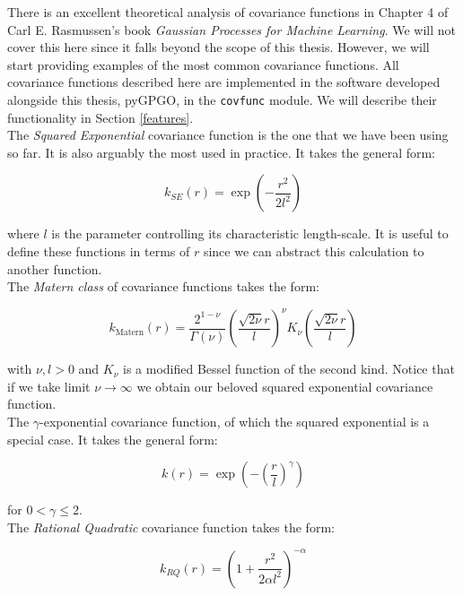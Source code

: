 \documentclass[10pt,a4paper,twoside]{book}
\begin{document}
There is an excellent theoretical analysis of covariance functions in Chapter 4 of Carl E. Rasmussen's book \textit{Gaussian Processes for Machine Learning}. We will not cover this here since it falls beyond the scope of this thesis. However, we will start providing examples of the most common covariance functions. All covariance functions described here are implemented in the software developed alongside this thesis, pyGPGO, in the \texttt{covfunc} module. We will describe their functionality in Section \ref{features}.\\

The \textit{Squared Exponential} covariance function is the one that we have been using so far. It is also arguably the most used in practice. It takes the general form:

\begin{equation}
k_{SE}(r) = \exp\left(-\dfrac{r^2}{2l^2} \right)
\end{equation}

where $l$ is the parameter controlling its characteristic length-scale. It is useful to define these functions in terms of $r$ since we can abstract this calculation to another function. \\

The \textit{Matern class} of covariance functions takes the form:

\begin{equation}
k_{\textrm{Matern}}(r) = \dfrac{2^{1-\nu}}{\Gamma(\nu)}\left(\dfrac{\sqrt{2\nu} r}{l}    \right)^\nu K_\nu\left( \dfrac{\sqrt{2\nu}r}{l} \right)
\end{equation}

with $\nu, l > 0$ and $K_\nu$ is a modified Bessel function of the second kind. Notice that if we take limit $\nu \rightarrow \infty$ we obtain our beloved squared exponential covariance function.\\


The $\gamma$-exponential covariance function, of which the squared exponential is a special case. It takes the general form:

\begin{equation}
k(r) = \exp\left( - \left(\dfrac{r}{l}\right)^\gamma  \right)
\end{equation}

for $0 < \gamma \leq 2$. \\

The \textit{Rational Quadratic} covariance function takes the form:

\begin{equation}
k_{RQ}(r) = \left( 1 + \dfrac{r^2}{2\alpha l^2} \right)^{-\alpha}
\end{equation}
\end{document}
